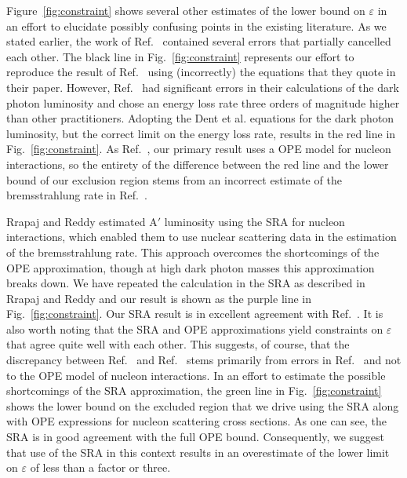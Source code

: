 \documentclass[nofootinbib,prd,superscriptaddress,twocolumn]{revtex4}
\begin{document}
Figure~\ref{fig:constraint} shows several other estimates of the lower bound on 
$\varepsilon$ in an effort to elucidate possibly confusing points in the existing 
literature. As we stated earlier, the work of Ref.~\cite{dent_etal12} contained several 
errors that partially cancelled each other. The black line in Fig.~\ref{fig:constraint} represents 
our effort to reproduce the result of Ref.~\cite{dent_etal12} using (incorrectly) the equations 
that they quote in their paper. However, Ref.~\cite{dent_etal12} had significant errors in 
their calculations of the dark photon luminosity and chose an energy loss rate three orders 
of magnitude higher than other practitioners. Adopting the Dent et al. \cite{dent_etal12} 
equations for the dark photon luminosity, but the correct limit on the energy loss rate, 
results in the red line in Fig.~\ref{fig:constraint}. As Ref.~\cite{dent_etal12}, our primary 
result uses a OPE model for nucleon interactions, so the entirety of the difference between 
the red line and the lower bound of our exclusion region stems from an incorrect estimate 
of the bremsstrahlung rate in Ref.~\cite{dent_etal12}. 


Rrapaj and Reddy \cite{rrapaj_reddy16} estimated $\mathrm{A'}$ luminosity 
using the SRA for nucleon interactions, which enabled them to use 
nuclear scattering data in the estimation of the bremsstrahlung rate. 
This approach overcomes the shortcomings of the OPE approximation, 
though at high dark photon masses this approximation breaks down. 
We have repeated the calculation in the SRA as described in 
Rrapaj and Reddy \cite{rrapaj_reddy16} and our result is 
shown as the purple line in Fig.~\ref{fig:constraint}. 
Our SRA result is in excellent agreement with Ref.~\cite{rrapaj_reddy16}. It is 
also worth noting that the SRA and OPE approximations yield constraints 
on $\varepsilon$ that agree quite well with each other. This suggests, of course, 
that the discrepancy between Ref.~\cite{dent_etal12} and Ref.~\cite{rrapaj_reddy16} 
stems primarily from errors in Ref.~\cite{dent_etal12} and not to the OPE model 
of nucleon interactions. In an effort to estimate 
the possible shortcomings of the SRA approximation, the green line in 
Fig.~\ref{fig:constraint} shows the lower bound on the excluded region that 
we drive using the SRA along with OPE expressions for nucleon scattering 
cross sections. As one can see, the SRA is in good agreement with the full 
OPE bound. Consequently, we suggest that use of the SRA in this context 
results in an overestimate of the lower limit on $\varepsilon$ of less than 
a factor or three. 
\end{document}
